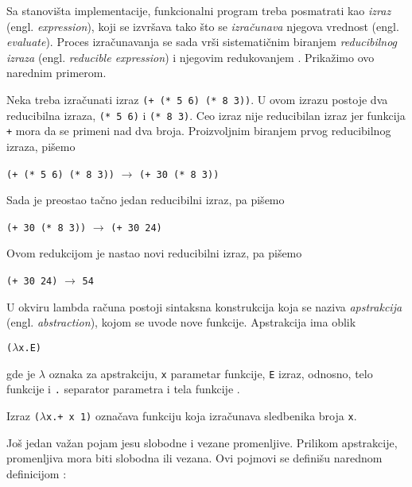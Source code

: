Sa stanovišta implementacije, funkcionalni program treba posmatrati kao \textit{izraz} (engl. \textit{expression}), koji se izvršava tako što se \textit{izračunava} njegova vrednost (engl. \textit{evaluate}). Proces izračunavanja se sada vrši sistematičnim biranjem \textit{reducibilnog izraza} (engl. \textit{reducible expression}) i njegovim redukovanjem \cite{the-implementation-of-functional-programming-languages}. Prikažimo ovo narednim primerom.

\begin{primer}
	Neka treba izračunati izraz \verb|(+ (* 5 6) (* 8 3))|. U ovom izrazu postoje dva reducibilna izraza, \verb|(* 5 6)| i \verb|(* 8 3)|. Ceo izraz nije reducibilan izraz jer funkcija \verb|+| mora da se primeni nad dva broja. Proizvoljnim biranjem prvog reducibilnog izraza, pišemo
	\begin{center}
		\verb|(+ (* 5 6) (* 8 3))| $\rightarrow$ \verb|(+ 30 (* 8 3))|
	\end{center}
	Sada je preostao tačno jedan reducibilni izraz, pa pišemo
	\begin{center}
		\verb|(+ 30 (* 8 3))| $\rightarrow$ \verb|(+ 30 24)|
	\end{center}
	Ovom redukcijom je nastao novi reducibilni izraz, pa pišemo
	\begin{center}
		\verb|(+ 30 24)| $\rightarrow$ \verb|54|
	\end{center}
\end{primer}

U okviru lambda računa postoji sintaksna konstrukcija koja se naziva \textit{apstrakcija} (engl. \textit{abstraction}), kojom se uvode nove funkcije. Apstrakcija ima oblik
\begin{center}
	\verb|(|$\lambda$\verb|x.E)|
\end{center} 
gde je $\lambda$ oznaka za apstrakciju, \verb|x| parametar funkcije, \verb|E| izraz, odnosno, telo funkcije i \verb|.| separator parametra i tela funkcije \cite{the-implementation-of-functional-programming-languages}.  
\begin{primer}
	Izraz \verb|(|$\lambda$\verb|x.+ x 1)| označava funkciju koja izračunava sledbenika broja \verb|x|.
\end{primer}

Još jedan važan pojam jesu slobodne i vezane promenljive. Prilikom apstrakcije, promenljiva mora biti slobodna ili vezana. Ovi pojmovi se definišu narednom definicijom \cite{the-implementation-of-functional-programming-languages}:

